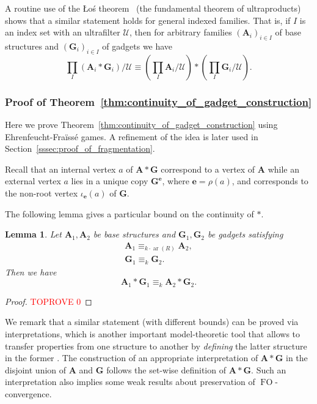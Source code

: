 \documentclass[11pt]{article}
\theoremstyle{plain}
\newtheorem{lemma}[theorem]{Lemma}
\theoremstyle{definition}
\theoremstyle{remark}
\DeclareMathOperator\aritysym{ar}
\newcommand{\arity}[1]{{\aritysym({#1})}}
\DeclareMathOperator\FO{FO}
\newcommand{\str}[1]{\mathbf{#1}}
\newcommand{\Los}{\L{}o\'{s}}
\newcommand{\tpl}[1]{{\bm{#1}}}
\begin{document}
A routine use of the \Los{} theorem~\cite{los} (the fundamental theorem of ultraproducts) shows that a similar statement holds for general indexed families.
That is, if $I$ is an index set with an ultrafilter $\mathcal{U}$, then for arbitrary families $(\str{A}_i)_{i \in I}$ of base structures and $(\str{G}_i)_{i \in I}$ of gadgets we have
\[
    \prod_I (\str{A}_i * \str{G}_i) / \mathcal{U} 
    \equiv 
    \left( \prod_I \str{A}_i / \mathcal{U} \right) * \left( \prod_I \str{G}_i / \mathcal{U} \right)
    .
\]

\subsubsection{Proof of Theorem~\ref{thm:continuity_of_gadget_construction}}\label{sssec:proof_ef_games}

Here we prove Theorem~\ref{thm:continuity_of_gadget_construction} using Ehrenfeucht-Fra\"{i}ss\'{e} games.
A refinement of the idea is later used in Section~\ref{sssec:proof_of_fragmentation}.

Recall that an internal vertex $a$ of $\str{A} * \str{G}$ correspond to a vertex of $\str{A}$ while an external vertex $a$ lies in a unique copy $\str{G}^\tpl{e}$, where $\tpl{e} = \rho(a)$, and corresponds to the non-root vertex $\iota_\tpl{e}(a)$ of $\str{G}$.

The following lemma gives a particular bound on the continuity of $*$.

\begin{lemma}\label{lem:continuity_bound_via_ef_games}
    Let $\str{A}_1, \str{A}_2$ be base structures and $\str{G}_1, \str{G}_2$ be gadgets satisfying
    \begin{equation*}
        \begin{gathered} \str{A}_1 \equiv_{k \cdot \arity{R}} \str{A}_2
            , \\
            \str{G}_1 \equiv_{k} \str{G}_2
            .
        \end{gathered}
    \end{equation*}
    Then we have
    \[
        \str{A}_1 * \str{G}_1 \equiv_k \str{A}_2 * \str{G}_2
        .
    \]
\end{lemma}
\begin{proof}\textcolor{red}{TOPROVE 0}\end{proof}

We remark that a similar statement (with different bounds) can be proved via interpretations, which is another important model-theoretic tool that allows to transfer properties from one structure to another by \emph{defining} the latter structure in the former \cite{hodges}\cite{unified_approach}.
The construction of an appropriate interpretation of $\str{A} * \str{G}$ in the disjoint union of $\str{A}$ and $\str{G}$ follows the set-wise definition of $\str{A} * \str{G}$.
Such an interpretation also implies some weak results about preservation of $\FO$-convergence.
\end{document}
